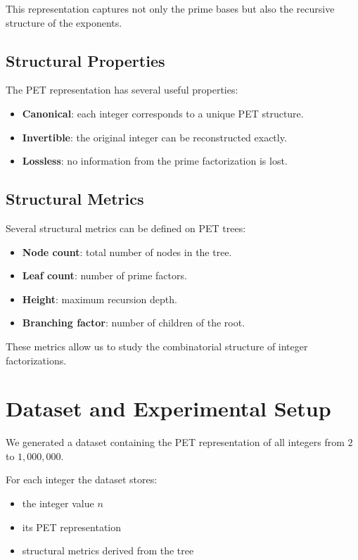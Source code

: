 \documentclass[11pt]{article}
\begin{document}
This representation captures not only the prime bases but also the recursive
structure of the exponents.

\subsection{Structural Properties}

The PET representation has several useful properties:

\begin{itemize}
\item \textbf{Canonical}: each integer corresponds to a unique PET structure.
\item \textbf{Invertible}: the original integer can be reconstructed exactly.
\item \textbf{Lossless}: no information from the prime factorization is lost.
\end{itemize}

\subsection{Structural Metrics}

Several structural metrics can be defined on PET trees:

\begin{itemize}
\item \textbf{Node count}: total number of nodes in the tree.
\item \textbf{Leaf count}: number of prime factors.
\item \textbf{Height}: maximum recursion depth.
\item \textbf{Branching factor}: number of children of the root.
\end{itemize}

These metrics allow us to study the combinatorial structure of integer
factorizations.

\section{Dataset and Experimental Setup}

We generated a dataset containing the PET representation of all integers
from $2$ to $1,000,000$.

For each integer the dataset stores:

\begin{itemize}
\item the integer value $n$
\item its PET representation
\item structural metrics derived from the tree
\end{itemize}
\end{document}
